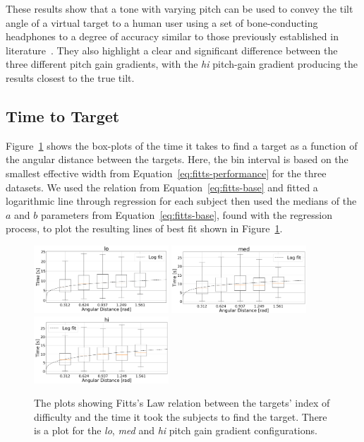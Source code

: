 \documentclass[format=sigconf, review=true, screen=true, anonymous=true]{acmart}
\begin{document}
These results show that a tone with varying pitch can be used to convey the tilt angle of a virtual target to a human user using a set of bone-conducting headphones to a degree of accuracy similar to those previously established in literature~\cite{bujacz2011sonification, katz2011spatial, zotkin2004rendering}. They also highlight a clear and significant difference between the three different pitch gain gradients, with the \emph{hi} pitch-gain gradient producing the results closest to the true tilt. 

\subsection{Time to Target}

Figure~\ref{fig:fitts} shows the box-plots of the time it takes to find a target as a function of the angular distance between the targets. Here, the bin interval is based on the smallest effective width from Equation~\ref{eq:fitts-performance} for the three datasets. We used the relation from Equation~\ref{eq:fitts-base} and fitted a logarithmic line through regression for each subject then used the medians of the $a$ and $b$ parameters from Equation~\ref{eq:fitts-base}, found with the regression process, to plot the resulting lines of best fit shown in Figure~\ref{fig:fitts}. 

\begin{figure}
  \centering
  \includegraphics[width=0.45\textwidth]{figures/fitts_lo.png}
  \includegraphics[width=0.45\textwidth]{figures/fitts_med.png}
  \includegraphics[width=0.45\textwidth]{figures/fitts_hi.png}
  \caption{The plots showing Fitts's Law relation between the targets' index of difficulty and the time it took the subjects to find the target. There is a plot for the \emph{lo}, \emph{med} and \emph{hi} pitch gain gradient configurations.} 
  \label{fig:fitts}
\end{figure}
\end{document}
